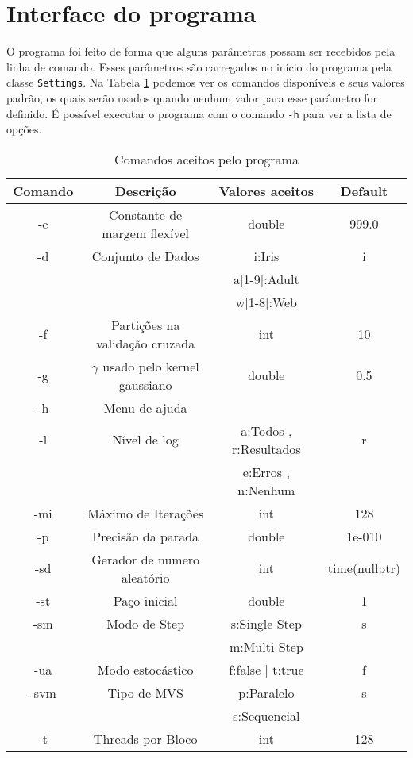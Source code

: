 \section{Interface do programa}
O programa foi feito de forma que alguns parâmetros possam ser recebidos pela linha de comando. 
Esses parâmetros são carregados no início do programa pela classe \texttt{Settings}.
Na Tabela \ref{tab:commands} podemos ver os comandos disponíveis e seus valores padrão, os quais serão usados quando nenhum valor para esse parâmetro for definido. É possível executar o programa com o comando \texttt{-h} para ver a lista de opções.

\begin{table}
    \caption{Comandos aceitos pelo programa}
    \label{tab:commands}
    \small
    \centering
    \begin{tabular}{|c|c|c|c|} \hline
        Comando & Descrição & Valores aceitos & Default \\ \hline
        -c & Constante de margem flexível & double & 999.0 \\ \hline
        -d & Conjunto de Dados &  i:Iris & i \\ 
         &  &  a[1-9]:Adult &  \\ 
         &  &  w[1-8]:Web &  \\ \hline
        -f & Partições na validação cruzada & int & 10 \\ \hline
        -g & $\gamma$ usado pelo kernel gaussiano & double & 0.5 \\ \hline
        -h & Menu de ajuda & & \\ \hline
        -l & Nível de log & a:Todos , r:Resultados  & r \\
           & & e:Erros , n:Nenhum & \\ \hline
        -mi & Máximo de Iterações & int & 128 \\ \hline
        -p & Precisão da parada & double & 1e-010 \\ \hline
        -sd & Gerador de numero aleatório & int & time(nullptr) \\ \hline
        -st & Paço inicial & double & 1 \\ \hline
        -sm & Modo de Step & s:Single Step & s \\
        & & m:Multi Step & \\ \hline
        -ua & Modo estocástico & f:false | t:true & f \\ \hline
        -svm & Tipo de MVS & p:Paralelo & s \\
         &  & s:Sequencial &  \\ \hline
        -t & Threads por Bloco & int & 128 \\ \hline
    \end{tabular}
\end{table}

